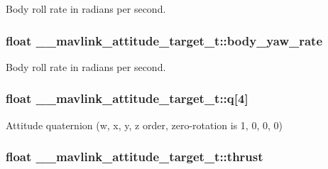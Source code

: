 Body roll rate in radians per second. 

\hypertarget{struct____mavlink__attitude__target__t_a3f999f4c4bd0cb8b9729b174459303c0}{
\subsubsection[{body\+\_\+yaw\+\_\+rate}]{\setlength{\rightskip}{0pt plus 5cm}float \+\_\+\+\_\+mavlink\+\_\+attitude\+\_\+target\+\_\+t\+::body\+\_\+yaw\+\_\+rate}}\label{struct____mavlink__attitude__target__t_a3f999f4c4bd0cb8b9729b174459303c0}


Body roll rate in radians per second. 

\hypertarget{struct____mavlink__attitude__target__t_a22e93897167920d75275ffce5e498737}{
\subsubsection[{q}]{\setlength{\rightskip}{0pt plus 5cm}float \+\_\+\+\_\+mavlink\+\_\+attitude\+\_\+target\+\_\+t\+::q\mbox{[}4\mbox{]}}}\label{struct____mavlink__attitude__target__t_a22e93897167920d75275ffce5e498737}


Attitude quaternion (w, x, y, z order, zero-\/rotation is 1, 0, 0, 0) 

\hypertarget{struct____mavlink__attitude__target__t_a198f948867f37042f9c9077e84f2052a}{
\subsubsection[{thrust}]{\setlength{\rightskip}{0pt plus 5cm}float \+\_\+\+\_\+mavlink\+\_\+attitude\+\_\+target\+\_\+t\+::thrust}}\label{struct____mavlink__attitude__target__t_a198f948867f37042f9c9077e84f2052a}


